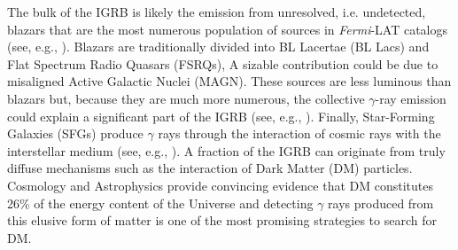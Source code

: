 \documentclass[12 pt]{article}
\newcommand{\FIXME}[1]{{\color{red}{\em Comment: }{#1}}}
\begin{document}
The bulk of the IGRB is likely the emission from unresolved, i.e. undetected, blazars that are the most numerous population of sources in {\it Fermi}-LAT catalogs (see, e.g., \cite{Ajello:2015mfa}).
Blazars are traditionally divided into BL Lacertae (BL Lacs) and Flat Spectrum Radio Quasars (FSRQs),
A sizable contribution could be due to misaligned Active Galactic Nuclei (MAGN). 
These sources are less luminous than blazars but, because they are much more numerous, the collective $\gamma$-ray emission could explain a significant part of the IGRB (see, e.g., \cite{DiMauro:2013xta}).
Finally, Star-Forming Galaxies (SFGs) produce $\gamma$ rays through the interaction of cosmic rays with the interstellar medium (see, e.g., \cite{2012ApJ...755..164A}).
A fraction of the IGRB can originate from truly diffuse mechanisms such as the interaction of Dark Matter (DM) particles. Cosmology and Astrophysics provide convincing evidence that DM constitutes 26\% of the energy content of the Universe and detecting $\gamma$ rays produced from this elusive form of matter is one of the most promising strategies to search for DM.  
\end{document}
